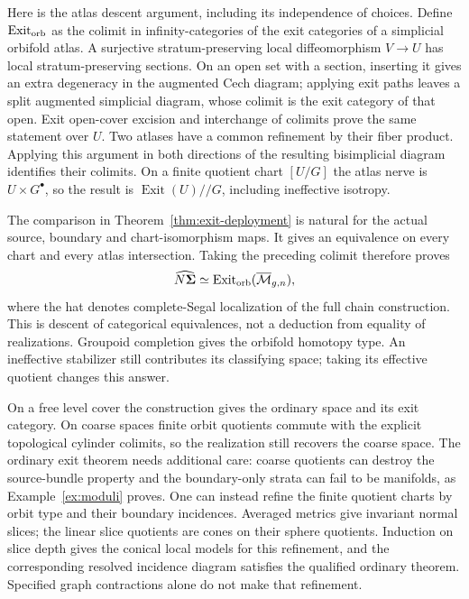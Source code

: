 \documentclass[11pt,a4paper]{article}
\theoremstyle{definition}
\begin{document}
Here is the atlas descent argument, including its independence of
choices. Define $\operatorname{Exit}_{\rm orb}$ as the colimit in
infinity-categories of the exit categories of a simplicial orbifold
atlas. A surjective stratum-preserving local diffeomorphism $V\to U$
has local stratum-preserving sections. On an open set with a section,
inserting it gives an extra degeneracy in the augmented Cech diagram;
applying exit paths leaves a split augmented simplicial diagram, whose
colimit is the exit category of that open. Exit open-cover excision
\cite[Theorem~A.7.1]{Lurie} and interchange of colimits prove the same
statement over $U$. Two atlases have a common refinement by their fiber
product. Applying this argument in both directions of the resulting
bisimplicial diagram identifies their colimits. On a finite quotient
chart $[U/G]$ the atlas nerve is $U\times G^\bullet$, so the result is
$\operatorname{Exit}(U)\mathbin{//}G$, including ineffective isotropy.

The comparison in Theorem~\ref{thm:exit-deployment} is natural for
the actual source, boundary and chart-isomorphism maps. It gives an
equivalence on every chart and every atlas intersection. Taking the
preceding colimit therefore proves
\[
 \widehat{N\boldsymbol\Sigma}\simeq
 \operatorname{Exit}_{\rm orb}(\overline{\mathcal M}_{g,n}),
\]
where the hat denotes complete-Segal localization of the full chain
construction. This is descent of categorical equivalences, not a
deduction from equality of realizations. Groupoid completion gives the
orbifold homotopy type. An ineffective stabilizer still contributes
its classifying space; taking its effective quotient changes this
answer.

On a free level cover the construction gives the ordinary space and
its exit category. On coarse spaces finite orbit quotients commute
with the explicit topological cylinder colimits, so the realization
still recovers the coarse space. The ordinary exit theorem needs
additional care: coarse quotients can destroy the source-bundle
property and the boundary-only strata can fail to be manifolds, as
Example~\ref{ex:moduli} proves. One can instead refine the finite
quotient charts by orbit type and their boundary incidences. Averaged
metrics give invariant normal slices; the linear slice quotients are
cones on their sphere quotients. Induction on slice depth gives the
conical local models for this refinement, and the corresponding
resolved incidence diagram satisfies the qualified ordinary theorem.
Specified graph contractions alone do not make that refinement.
\end{document}
